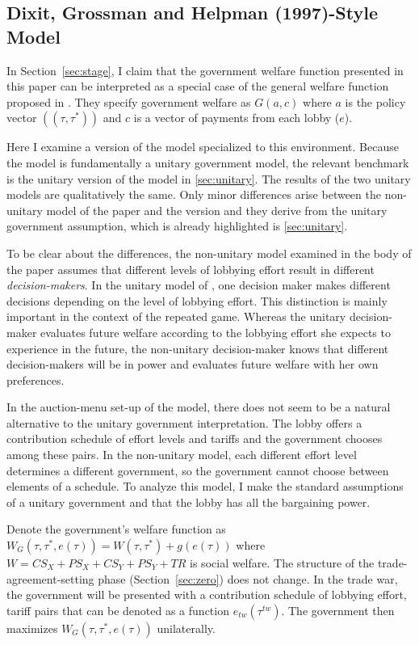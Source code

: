 \documentclass[authoryear, review]{elsarticle}
\begin{document}
\subsection{Dixit, Grossman and Helpman (1997)-Style Model}
\label{sec:dgh}
In Section~\ref{sec:stage}, I claim that the government welfare function presented in this paper can be interpreted as a special case of the general welfare function proposed in \citet{dgh97}. They specify government welfare as $G(a,c)$ where $a$ is the policy vector $\left(\left(\tau,\tau^*\right)\right)$ and $c$ is a vector of payments from each lobby ($e$). 

Here I examine a version of the \citet{dgh97} model specialized to this environment. Because the \citet{dgh97} model is fundamentally a unitary government model, the relevant benchmark is the unitary version of the model in \ref{sec:unitary}. The results of the two unitary models are qualitatively the same. Only minor differences arise between the non-unitary model of the paper and the \citet{dgh97} version and they derive from the unitary government assumption, which is already highlighted is \ref{sec:unitary}.

To be clear about the differences, the non-unitary model examined in the body of the paper assumes that different levels of lobbying effort result in different \textit{decision-makers}. In the unitary model of \citet{dgh97}, one decision maker makes different decisions depending on the level of lobbying effort. This distinction is mainly important in the context of the repeated game. Whereas the unitary decision-maker evaluates future welfare according to the lobbying effort she expects to experience in the future, the non-unitary decision-maker knows that different decision-makers will be in power and evaluates future welfare with her own preferences.

In the auction-menu set-up of the \citet{dgh97} model, there does not seem to be a natural alternative to the unitary government interpretation. The lobby offers a contribution schedule of effort levels and tariffs and the government chooses among these pairs. In the non-unitary model, each different effort level determines a different government, so the government cannot choose between elements of a schedule. To analyze this model, I make the standard assumptions of a unitary government and that the lobby has all the bargaining power.

Denote the government's welfare function as $W_G(\tau,\tau^*,e(\tau)) = W(\tau,\tau^*) + g(e(\tau))$ where $W = CS_X + PS_X + CS_Y + PS_Y +TR$ is social welfare. The structure of the trade-agreement-setting phase (Section~\ref{sec:zero}) does not change. In the trade war, the government will be presented with a contribution schedule of lobbying effort, tariff pairs that can be denoted as a function $e_{tw}(\tau^{tw})$. The government then maximizes $W_G(\tau,\tau^*,e(\tau))$ unilaterally.
\end{document}
